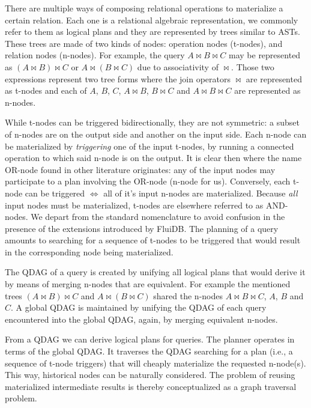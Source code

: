 There are multiple ways of composing relational operations to
materialize a certain relation. Each one is a relational algebraic
representation, we commonly refer to them as logical plans and they
are represented by trees similar to ASTs. These trees are made of two
kinds of nodes: operation nodes (t-nodes), and relation nodes
(n-nodes). For example, the query \(A \Join B \Join C\) may be
represented as \((A \Join B) \Join C\) or \(A \Join (B \Join C)\) due
to associativity of \(\Join\). Those two expressions represent two
tree forms where the join operators \(\Join\) are represented as
t-nodes and each of \(A\), \(B\), \(C\), \(A \Join B\), \(B \Join C\)
and \(A \Join B \Join C\) are represented as n-nodes.

While t-nodes can be triggered bidirectionally, they are not
symmetric: a subset of n-nodes are on the output side and another on
the input side. Each n-node can be materialized by \emph{triggering}
one of the input t-nodes, by running a connected operation to which
said n-node is on the output. It is clear then where the name OR-node
found in other literature originates: any of the input nodes may
participate to a plan involving the OR-node (n-node for
us). Conversely, each t-node can be triggered \(\iff\) all of it's
input n-nodes are materialized. Because \emph{all} input nodes must be
materialized, t-nodes are elsewhere referred to as AND-nodes. We
depart from the standard nomenclature to avoid confusion in the
presence of the extensions introduced by FluiDB. The planning of a
query amounts to searching for a sequence of t-nodes to be triggered
that would result in the corresponding node being materialized.

The QDAG of a query is created by unifying all logical plans that
would derive it by means of merging n-nodes that are equivalent. For
example the mentioned trees \((A \Join B) \Join C\) and \(A \Join (B
\Join C)\) shared the n-nodes \(A \Join B \Join C\), \(A\), \(B\) and
\(C\). A global QDAG is maintained by unifying the QDAG of each query
encountered into the global QDAG, again, by merging equivalent
n-nodes.

From a QDAG we can derive logical plans for queries. The planner
operates in terms of the global QDAG. It traverses the QDAG searching
for a plan (i.e., a sequence of t-node triggers) that will cheaply
materialize the requested n-node(s). This way, historical nodes can be
naturally considered. The problem of reusing materialized intermediate
results is thereby conceptualized as a graph traversal problem.

